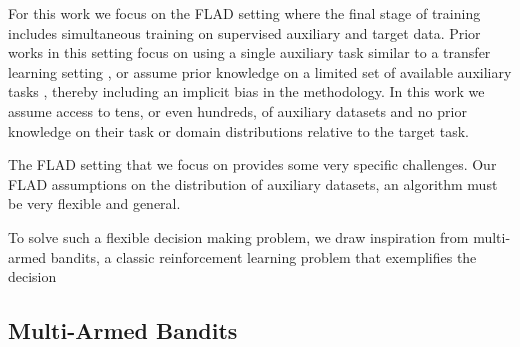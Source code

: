 
For this work we focus on the FLAD setting where the final stage of training includes simultaneous training on supervised auxiliary and target data. Prior works in this setting focus on using a single auxiliary task similar to a transfer learning setting \cite{https://doi.org/10.48550/arxiv.1812.02224,chen2022weighted}, or assume prior knowledge on a limited set of available auxiliary tasks \citep{Guo2018DynamicMM}, thereby including an implicit bias in the methodology. In this work we assume access to tens, or even hundreds, of auxiliary datasets and no prior knowledge on their task or domain distributions relative to the target task. 




The FLAD setting that we focus on provides some very specific challenges. Our FLAD assumptions on the distribution of auxiliary datasets, an algorithm must be very flexible and general.

To solve such a flexible decision making problem, we draw inspiration from multi-armed bandits, a classic reinforcement learning problem that exemplifies the decision 

\subsection{Multi-Armed Bandits}

